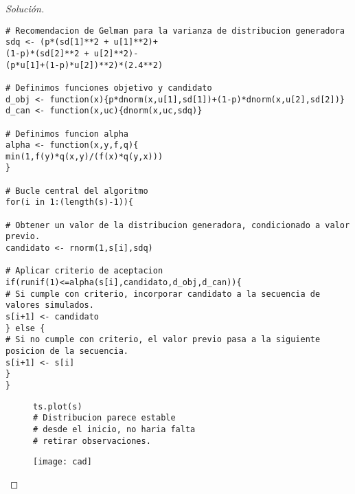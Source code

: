 \documentclass[11pt]{article}
\renewcommand{\=}[1]{\stackrel{#1}{=}} %
\newenvironment{sol}
{\begin{proof}[Solución]}
	{\end{proof}}
\theoremstyle{definition}
\theoremstyle{remark}
\begin{document}
\begin{itemize}
\begin{sol}
{\begin{lstlisting}[style=myRstyle, caption={Algoritmo de Metropolis-Hastings.}]
# Recomendacion de Gelman para la varianza de distribucion generadora
sdq <- (p*(sd[1]**2 + u[1]**2)+
(1-p)*(sd[2]**2 + u[2]**2)-
(p*u[1]+(1-p)*u[2])**2)*(2.4**2)

# Definimos funciones objetivo y candidato
d_obj <- function(x){p*dnorm(x,u[1],sd[1])+(1-p)*dnorm(x,u[2],sd[2])}
d_can <- function(x,uc){dnorm(x,uc,sdq)}

# Definimos funcion alpha
alpha <- function(x,y,f,q){
min(1,f(y)*q(x,y)/(f(x)*q(y,x)))
}

# Bucle central del algoritmo
for(i in 1:(length(s)-1)){

# Obtener un valor de la distribucion generadora, condicionado a valor previo.
candidato <- rnorm(1,s[i],sdq)

# Aplicar criterio de aceptacion
if(runif(1)<=alpha(s[i],candidato,d_obj,d_can)){
# Si cumple con criterio, incorporar candidato a la secuencia de valores simulados.
s[i+1] <- candidato
} else {
# Si no cumple con criterio, el valor previo pasa a la siguiente posicion de la secuencia.
s[i+1] <- s[i]
}
}
	\end{lstlisting}
}			
	\begin{figure}[h]
		
	\hspace*{0.9cm}\begin{minipage}{7.3cm}
		{
			\begin{lstlisting}[style=myRstyle, caption={Revisión del gráfico de cadena / MN.}]
ts.plot(s)
# Distribucion parece estable
# desde el inicio, no haria falta
# retirar observaciones.

			\end{lstlisting}
		}			
	\end{minipage}
	\begin{minipage}{6cm}
		\texttt{[image: cad]}
	\end{minipage}
\end{figure}


\end{sol}
\end{itemize}
\end{document}
